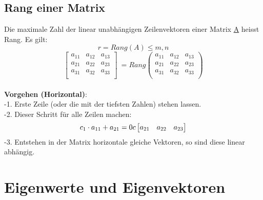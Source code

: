 \subsection{Rang einer Matrix}
Die maximale Zahl der linear unabhängigen Zeilenvektoren einer Matrix \underline{A} heisst Rang.
Es gilt:
\[
	r= Rang(A)\leq m,n
\]
\[
\begin{bmatrix}
	a_{11} & a_{12} & a_{13} \\
	a_{21} & a_{22}& a_{23}  \\
	a_{31} & a_{32} & a_{33}  \\
	\end{bmatrix}
\	
	=Rang
	\begin{pmatrix}
		a_{11} & a_{12} & a_{13} \\
		a_{21} & a_{22}& a_{23}  \\
		a_{31} & a_{32} & a_{33}  \\
		\end{pmatrix}
\]
\\
\textbf{Vorgehen (Horizontal)}:\\
-1. Erste Zeile (oder die mit der tiefsten Zahlen) stehen lassen.\\
-2. Dieser Schritt für alle Zeilen machen:
\[
	c_1\cdot a_{11} + a_{21} = 0\\
	c\begin{bmatrix} a_{21} & a_{22}& a_{23}  \\  \end{bmatrix} 
\]
-3. Entstehen in der Matrix horizontale gleiche Vektoren, so sind diese linear abhängig.
\\
\section{Eigenwerte und Eigenvektoren}

